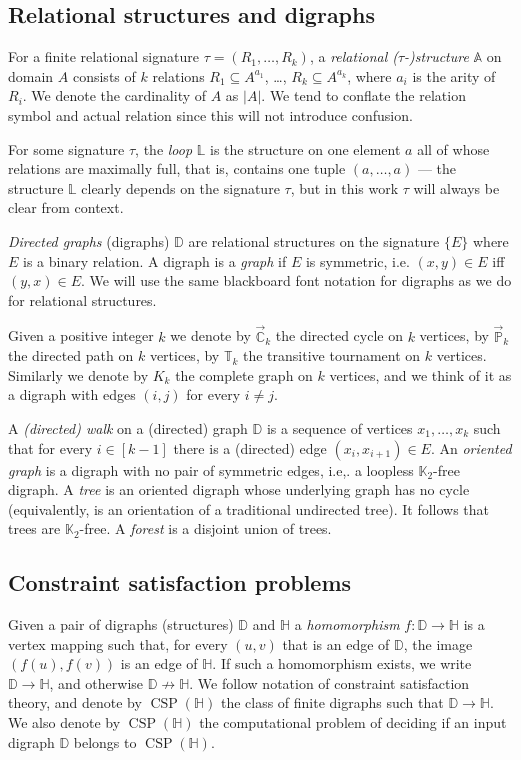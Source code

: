 \documentclass{article}
\theoremstyle{definition}
\theoremstyle{remark}
\DeclareMathOperator{\CSP}{CSP}
\newcommand{\bA}{{\mathbb A}}
\newcommand{\bC}{{\mathbb C}}
\newcommand{\bD}{{\mathbb D}}
\newcommand{\bH}{{\mathbb H}}
\newcommand{\bK}{{\mathbb K}}
\newcommand{\bL}{{\mathbb L}}
\newcommand{\bP}{{\mathbb P}}
\newcommand{\bT}{{\mathbb T}}
\begin{document}
\subsection{Relational structures and digraphs}

For a finite relational signature $\tau=(R_1,\ldots,R_k)$, a \emph{relational ($\tau$-)structure}
$\bA$ on domain $A$ consists of $k$ relations $R_1 \subseteq A^{a_1}$, \ldots, $R_k \subseteq A^{a_k}$,
where $a_i$ is the arity of $R_i$. We denote the cardinality of $A$ as $|A|$. We tend to conflate the
relation symbol and actual relation since this will not introduce confusion. 

For some signature $\tau$, the \emph{loop} $\bL$ is the structure on one element $a$ all of whose
relations are maximally full, that is, contains one tuple $(a, \ldots, a)$ ---  the structure $\bL$
clearly depends on the signature $\tau$, but in this work $\tau$ will always be clear from context.

\emph{Directed graphs} (digraphs) $\bD$ are relational structures on the signature
$\{E\}$ where $E$ is a binary relation. A digraph is a \emph{graph} if $E$ is
symmetric, \mbox{i.e.} $(x,y) \in E$ iff $(y,x) \in E$. We will use the same blackboard 
font notation for digraphs as we do for relational structures. 


Given a positive integer $k$ we denote by $\vec{\bC}_k$ the directed cycle on $k$ vertices, 
by $\vec{\bP}_k$ the directed path on $k$ vertices, by $\bT_k$ the transitive tournament
on $k$ vertices. Similarly we denote by $K_k$ the complete 
graph on $k$ vertices, and we think of it as a digraph with edges $(i,j)$ for
every $i\neq j$.

A \emph{(directed) walk} on a (directed) graph  $\bD$ is a sequence of vertices
$x_1,\dots, x_k$ such that for every $i\in[k-1]$ there is a (directed) edge
$(x_i,x_{i+1})\in E$. An \emph{oriented graph} is a digraph with no pair of symmetric edges, i.e,.
a loopless $\bK_2$-free digraph.
A \emph{tree} is an oriented digraph whose underlying graph has no cycle (equivalently, is an orientation of a traditional undirected tree).
It follows that trees are $\bK_2$-free. A \emph{forest} is a disjoint union of trees. 

\subsection{Constraint satisfaction problems}

Given a pair of digraphs (structures) $\bD$ and $\bH$ a \emph{homomorphism} $f\colon \bD\to \bH$
is a vertex mapping such that, for every $(u,v)$ that is an edge of $\bD$, the image $(f(u),f(v))$ is an edge
of $\bH$. If such a homomorphism exists, we write $\bD\to \bH$, and otherwise $\bD\not\to \bH$.
We follow notation of constraint satisfaction theory, and denote by $\CSP(\bH)$ the class
of finite digraphs such that $\bD \to \bH$. We also denote by $\CSP(\bH)$ the computational problem
of deciding if an input digraph $\bD$ belongs to $\CSP(\bH)$. 
\end{document}
